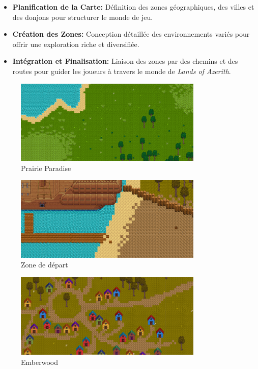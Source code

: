 \begin{itemize}

      \item \textbf{Planification de la Carte:} Définition des zones géographiques, des villes et des donjons pour structurer le monde de jeu.
            \\

      \item \textbf{Création des Zones:} Conception détaillée des environnements variés pour offrir une exploration riche et diversifiée.
            \\

      \item \textbf{Intégration et Finalisation:} Liaison des zones par des chemins et des routes pour guider les joueurs à travers le monde de \textit{Lands of Azerith}.
            \\

\end{itemize}

\begin{figure}[H]
      \centering
      \includegraphics[width=0.8\textwidth]{assets/map.png}
      \caption{Prairie Paradise}
      \label{fig:map1}
\end{figure}

\begin{figure}[H]
      \centering
      \includegraphics[width=0.8\textwidth]{assets/map2.png}
      \caption{Zone de départ}
      \label{fig:map2}
\end{figure}

\begin{figure}[H]
      \centering
      \includegraphics[width=0.8\textwidth]{assets/map3.png}
      \caption{Emberwood}
      \label{fig:map3}
\end{figure}


